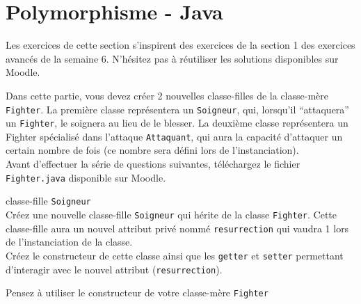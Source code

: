 \section{Polymorphisme - Java}

Les exercices de cette section s'inspirent des exercices de la section 1 des exercices avancés de la semaine 6.
N'hésitez pas à réutiliser les solutions disponibles sur Moodle.

Dans cette partie, vous devez créer 2 nouvelles classe-filles de la classe-mère \lstinline{Fighter}. La première classe représentera un \lstinline{Soigneur}, qui, lorsqu'il ``attaquera'' un \lstinline{Fighter}, le soignera au lieu de le blesser. La deuxième classe représentera un Fighter spécialisé dans l'attaque \lstinline{Attaquant}, qui aura la capacité d'attaquer un certain nombre de fois (ce nombre sera défini lors de l'instanciation).\\

Avant d'effectuer la série de questions suivantes, téléchargez le fichier \lstinline{Fighter.java} disponible sur Moodle.\\

% 

\begin{Exercice}[5 minutes] classe-fille \lstinline{Soigneur} \\
Créez une nouvelle classe-fille \lstinline{Soigneur} qui hérite de la classe \lstinline{Fighter}. Cette classe-fille aura un nouvel attribut privé nommé \lstinline{resurrection} qui vaudra 1 lors de l'instanciation de la classe. \\

Créez le constructeur de cette classe ainsi que les \lstinline{getter} et \lstinline{setter} permettant d'interagir avec le nouvel attribut (\lstinline{resurrection}). \\

\begin{conseil}
Pensez à utiliser le constructeur de votre classe-mère \lstinline{Fighter}
\end{conseil}

\begin{solution}
	
\end{solution}

\end{Exercice}

